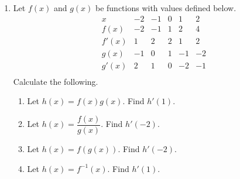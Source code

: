 \documentclass[11pt]{article}
\begin{document}
\begin{enumerate}
\item Let $f(x)$ and $g(x)$ be functions with values defined below.
  \[
  \begin{array}{c||c|c|c|c|c}
    x & -2 & -1 & 0 & 1 & 2\\
    \hline\hline
    f(x) & -2 & -1 & 1 & 2 & 4\\ \hline
    f'(x) & 1 & 2 & 2 & 1 & 2\\ \hline
    g(x) & -1 & 0 & 1 & -1 & -2\\ \hline
    g'(x) & 2 & 1 & 0 & -2 & -1\\ 
  \end{array}
  \]
  Calculate the following.
  \begin{enumerate}
  \item Let $h(x)=f(x)g(x)$.  Find $h'(1)$.\vfill
  \item Let $h(x)=\dfrac{f(x)}{g(x)}$.  Find $h'(-2)$.\vfill
  \item Let $h(x)=f(g(x))$.  Find $h'(-2)$.\vfill
  \item Let $h(x)=f^{-1}(x)$.  Find $h'(1)$.\vfill
  \end{enumerate}
  
  
\end{enumerate}
\end{document}
